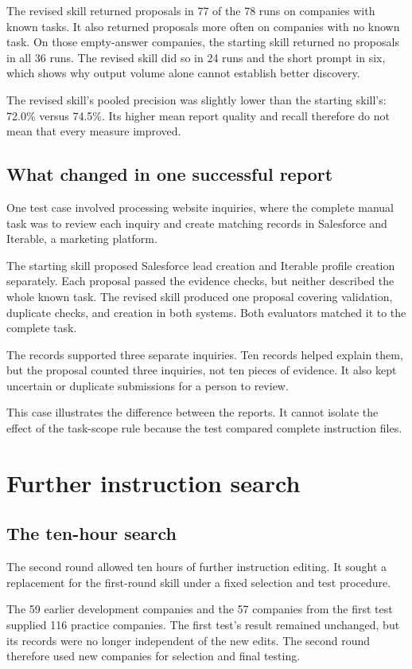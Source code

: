 \documentclass[11pt]{article}
\begin{document}
The revised skill returned proposals in 77 of the 78 runs on companies with known tasks. It also returned proposals more often on companies with no known task. On those empty-answer companies, the starting skill returned no proposals in all 36 runs. The revised skill did so in 24 runs and the short prompt in six, which shows why output volume alone cannot establish better discovery.

The revised skill's pooled precision was slightly lower than the starting skill's: 72.0\% versus 74.5\%. Its higher mean report quality and recall therefore do not mean that every measure improved.

\subsection{What changed in one successful report}
One test case involved processing website inquiries, where the complete manual task was to review each inquiry and create matching records in Salesforce and Iterable, a marketing platform.

The starting skill proposed Salesforce lead creation and Iterable profile creation separately. Each proposal passed the evidence checks, but neither described the whole known task. The revised skill produced one proposal covering validation, duplicate checks, and creation in both systems. Both evaluators matched it to the complete task.

The records supported three separate inquiries. Ten records helped explain them, but the proposal counted three inquiries, not ten pieces of evidence. It also kept uncertain or duplicate submissions for a person to review.

This case illustrates the difference between the reports. It cannot isolate the effect of the task-scope rule because the test compared complete instruction files.

\section{Further instruction search}
\subsection{The ten-hour search}
The second round allowed ten hours of further instruction editing. It sought a replacement for the first-round skill under a fixed selection and test procedure.

The 59 earlier development companies and the 57 companies from the first test supplied 116 practice companies. The first test's result remained unchanged, but its records were no longer independent of the new edits. The second round therefore used new companies for selection and final testing.
\end{document}
